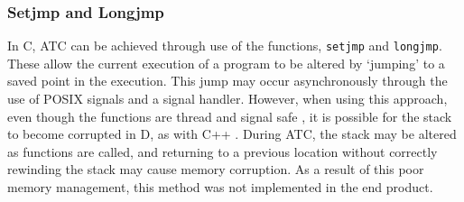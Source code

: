 \subsubsection*{Setjmp and Longjmp} 
In C, ATC can be achieved through use of the functions, \texttt{setjmp} and 
\texttt{longjmp}. These allow 
the current execution of a program to be altered by `jumping' to a saved
point in the execution.
This jump may occur asynchronously through the use of POSIX signals 
and a signal handler. 
However, when using this approach, even though the functions are thread and
signal safe \cite{setjmp}, it is possible for the stack to become corrupted in
D, as with C++ \cite{unwinding-stack}. 
During ATC, the stack may be altered as functions are called, and returning to a 
previous location without correctly rewinding the stack may cause memory corruption. 
As a result of this poor memory management, this method was 
not implemented in the end product.

